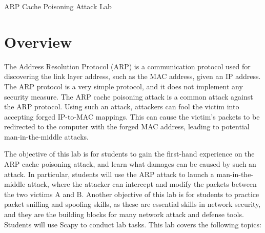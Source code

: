 




\newcommand{\arpFigs}{./Figs}






\begin{center}
{\LARGE ARP Cache Poisoning Attack Lab}
\end{center}




\section{Overview}


The Address Resolution Protocol (ARP) is a communication protocol used for discovering the link
layer address, such as the MAC address, given an IP address. The ARP protocol is a very simple
protocol, and it does not implement any security measure. 
The ARP cache poisoning attack is a common attack against the ARP protocol. 
Using such an attack, attackers can fool the victim into accepting
forged IP-to-MAC mappings. This can cause the victim's packets to be 
redirected to the computer with the forged MAC address, leading to
potential man-in-the-middle attacks.


The objective of this lab is for students to gain the first-hand experience on the ARP cache
poisoning attack, and learn what damages can be caused by such an attack.
In particular, students will use the ARP attack to launch a man-in-the-middle attack,  
where the attacker can intercept and modify the packets between the two victims A and B. 
Another objective of this lab is for students to practice 
packet sniffing and spoofing skills, as these are 
essential skills in network security, and they are the building blocks
for many network attack and defense tools. 
Students will use Scapy to conduct lab tasks. 
This lab covers the following topics:


